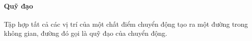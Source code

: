 \begin{tomtat}
	\paragraph{Quỹ đạo}
	\begin{dn}
		Tập hợp tất cả các vị trí của một chất điểm chuyển động tạo ra một đường trong không gian, đường đó gọi là quỹ đạo của chuyển động.
	\end{dn}

\end{tomtat}
